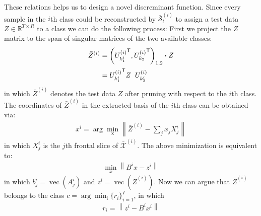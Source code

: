 \documentclass[journal]{IEEEtran}
\newcommand\norm[1]{\left\lVert#1\right\rVert}
\newcommand{\trans}{\mathsf{T}}
\begin{document}
	
	These relations helps us to design a novel discreminant function. Since every sample in the $i$th class could be reconstructed by $\bar{\mathcal{S}}^{(i)}_l$ to assign a test data $Z \in \mathbb{R}^{T \times R}$ to a class we can do the following process: First we project the $Z$ matrix to the span of singular matrices of the two available classes:
	\begin{align}
	\bar{Z}^{(i)} &= \left( 
	{U_{k_1^i}^{(i)}}^{\trans},  {U_{k_2}^{(i)}}^{\trans} 
	\right)_{1,2} \boldsymbol{\cdot} Z \notag \\
	&= {U_{k_1^i}^{(i)}}^{\trans} Z \hspace{2mm} U_{k_2^i}^{(i)}\label{DR_test}
	\end{align} 
	in which $\bar{Z}^{(i)}$ denotes the test data $Z$ after pruning with respect to the $i$th class. 
	The coordinates of $\bar{Z}^{(i)}$ in the extracted basis of the $i$th class can be obtained via:
	\begin{align*}
	x^i =\operatorname{arg} \min_\mathrm{x} \norm{\bar{Z}^{(i)} - \sum_{j} x_j X_{j}^i  } 
	\end{align*}
	in which $X_{j}^i$ is %
	the $j$th frontal slice of $\bar{\mathcal{X}}^{(i)}$. The above minimization is equivalent to: 
	\begin{align*}
	\min_x \norm{B^i x -z^i }
	\end{align*} 
	in which 
	$b^i_j = \operatorname{vec}(A^i_{j})$
	and
	$z^i = \operatorname{vec}(\bar{Z}^{(i)})$. 
	Now we can argue that $\bar{Z}^{(i)}$ belongs to the class $c = \operatorname{arg} \min_\mathrm{i} \{ r_i\}_{i = 1}^{I}$,
	in which 
	\begin{align}
	r_i = \norm{z^i - B^i x^i} \label{Residual}
	\end{align}
	
	
\end{document}

